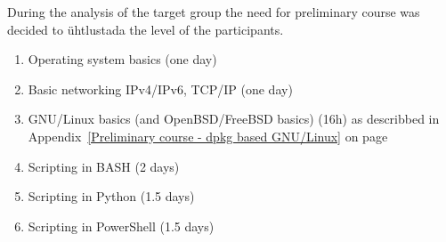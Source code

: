 During the analysis of the target group the need for preliminary course was decided to ühtlustada the level of the participants.
    \begin{enumerate}[label=LAB \arabic*.,leftmargin=*]
  	\item Operating system basics (one day)
  	\item Basic networking IPv4/IPv6, TCP/IP (one day)
  	\item GNU/Linux basics (and OpenBSD/FreeBSD basics) (16h) as describbed in Appendix~\ref{Preliminary course - dpkg based GNU/Linux} on page~\pageref{Preliminary course - dpkg based GNU/Linux}
  	\item Scripting in BASH (2 days)
  	\item Scripting in Python (1.5 days)
  	\item Scripting in PowerShell (1.5 days)
  \end{enumerate}

